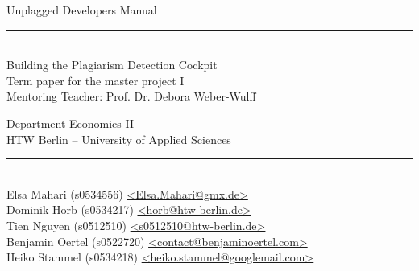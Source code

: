 \begin{titlepage}
\vspace*{2cm}

\begin{center}
\Huge
Unplagged Developers Manual\\
\large
\vspace{0.5cm}
\rule[3mm]{1cm}{0.05mm}\\
Building the Plagiarism Detection Cockpit\\
\normalsize
\vfill
Term paper for the master project I \\ Mentoring Teacher: Prof. Dr. Debora Weber-Wulff\\
\vfill

Department Economics II\\
HTW Berlin -- University of Applied Sciences\\

\rule{8.2cm}{0.2mm}\\
Elsa Mahari (s0534556) \href{mailto:elsa.mahari@gmx.de}{\textless Elsa.Mahari@gmx.de\textgreater}\\
Dominik Horb (s0534217) \href{mailto:horb@htw-berlin.de}{\textless horb@htw-berlin.de\textgreater}\\
Tien Nguyen (s0512510) \href{mailto:s0512510@htw-berlin.de}{\textless s0512510@htw-berlin.de\textgreater}\\
Benjamin Oertel (s0522720) \href{mailto:contact@benjaminoertel.com}{\textless contact@benjaminoertel.com\textgreater}\\
Heiko Stammel (s0534218) \href{mailto:heiko.stammel@googlemail.com}{\textless heiko.stammel@googlemail.com\textgreater}\\


\end{center}
\end{titlepage}